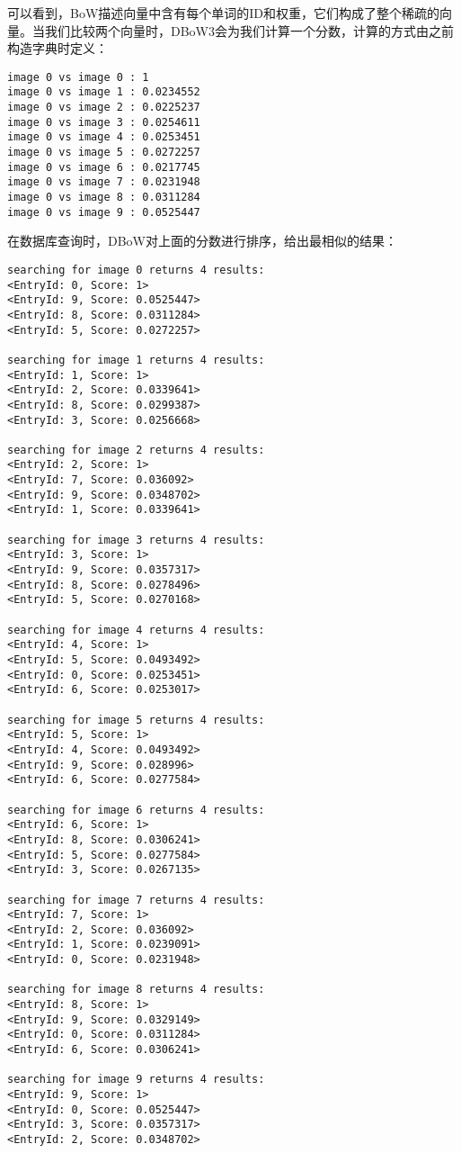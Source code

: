 可以看到，BoW描述向量中含有每个单词的ID和权重，它们构成了整个稀疏的向量。当我们比较两个向量时，DBoW3会为我们计算一个分数，计算的方式由之前构造字典时定义：

\begin{lstlisting}
image 0 vs image 0 : 1
image 0 vs image 1 : 0.0234552
image 0 vs image 2 : 0.0225237
image 0 vs image 3 : 0.0254611
image 0 vs image 4 : 0.0253451
image 0 vs image 5 : 0.0272257
image 0 vs image 6 : 0.0217745
image 0 vs image 7 : 0.0231948
image 0 vs image 8 : 0.0311284
image 0 vs image 9 : 0.0525447
\end{lstlisting}

在数据库查询时，DBoW对上面的分数进行排序，给出最相似的结果：
\begin{lstlisting}
searching for image 0 returns 4 results:
<EntryId: 0, Score: 1>
<EntryId: 9, Score: 0.0525447>
<EntryId: 8, Score: 0.0311284>
<EntryId: 5, Score: 0.0272257>

searching for image 1 returns 4 results:
<EntryId: 1, Score: 1>
<EntryId: 2, Score: 0.0339641>
<EntryId: 8, Score: 0.0299387>
<EntryId: 3, Score: 0.0256668>

searching for image 2 returns 4 results:
<EntryId: 2, Score: 1>
<EntryId: 7, Score: 0.036092>
<EntryId: 9, Score: 0.0348702>
<EntryId: 1, Score: 0.0339641>

searching for image 3 returns 4 results:
<EntryId: 3, Score: 1>
<EntryId: 9, Score: 0.0357317>
<EntryId: 8, Score: 0.0278496>
<EntryId: 5, Score: 0.0270168>

searching for image 4 returns 4 results:
<EntryId: 4, Score: 1>
<EntryId: 5, Score: 0.0493492>
<EntryId: 0, Score: 0.0253451>
<EntryId: 6, Score: 0.0253017>

searching for image 5 returns 4 results:
<EntryId: 5, Score: 1>
<EntryId: 4, Score: 0.0493492>
<EntryId: 9, Score: 0.028996>
<EntryId: 6, Score: 0.0277584>

searching for image 6 returns 4 results:
<EntryId: 6, Score: 1>
<EntryId: 8, Score: 0.0306241>
<EntryId: 5, Score: 0.0277584>
<EntryId: 3, Score: 0.0267135>

searching for image 7 returns 4 results:
<EntryId: 7, Score: 1>
<EntryId: 2, Score: 0.036092>
<EntryId: 1, Score: 0.0239091>
<EntryId: 0, Score: 0.0231948>

searching for image 8 returns 4 results:
<EntryId: 8, Score: 1>
<EntryId: 9, Score: 0.0329149>
<EntryId: 0, Score: 0.0311284>
<EntryId: 6, Score: 0.0306241>

searching for image 9 returns 4 results:
<EntryId: 9, Score: 1>
<EntryId: 0, Score: 0.0525447>
<EntryId: 3, Score: 0.0357317>
<EntryId: 2, Score: 0.0348702>
\end{lstlisting}

